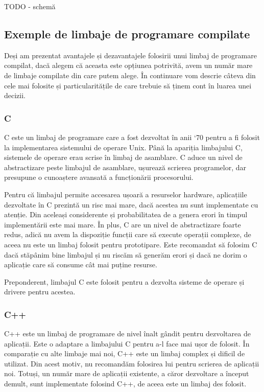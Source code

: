 TODO - schemă

\subsection{Exemple de limbaje de programare compilate}
\label{sec:appdev-langs-comp-ex}

Deși am prezentat avantajele și dezavantajele folosirii unui limbaj de
programare compilat, dacă alegem că aceasta este opțiunea potrivită, avem un
număr mare de limbaje compilate din care putem alege. În continuare vom descrie
câteva din cele mai folosite și particularitățile de care trebuie să ținem cont
în luarea unei decizii.

\subsubsection{C}
\label{sec:appdev-langs-comp-ex-c}

C este un limbaj de programare care a fost dezvoltat în anii ‘70 pentru a fi
folosit la implementarea sistemului de operare Unix. Până la apariția limbajului
C, sistemele de operare erau scrise în limbaj de asamblare. C aduce un nivel de
abstractizare peste limbajul de asamblare, ușurează scrierea programelor, dar
presupune o cunoaștere avansată a funcționării procesorului.

Pentru că limbajul permite accesarea ușoară a resurselor hardware, aplicațiile
dezvoltate în C prezintă un risc mai mare, dacă acestea nu sunt implementate cu
atenție. Din aceleași considerente și probabilitatea de a genera erori în timpul
implementării este mai mare. În plus, C are un nivel de abstractizare foarte
redus, adică nu avem la dispoziție funcții care să execute operații complexe, de
aceea nu este un limbaj folosit pentru prototipare. Este recomandat să folosim C
dacă stăpânim bine limbajul și nu riscăm să generăm erori și dacă ne dorim o
aplicație care să consume cât mai puține resurse.

Preponderent, limbajul C este folosit pentru a dezvolta sisteme de operare și
drivere pentru acestea.

\subsubsection{C++}
\label{sec:appdev-langs-comp-ex-cpp}

C++ este un limbaj de programare de nivel înalt gândit pentru dezvoltarea de
aplicații. Este o adaptare a limbajului C pentru a-l face mai ușor de folosit.
În comparație cu alte limbaje mai noi, C++ este un limbaj complex și dificil de
utilizat. Din acest motiv, nu recomandăm folosirea lui pentru scrierea de
aplicații noi. Totuși, un număr mare de aplicații existente, a căror dezvoltare
a început demult, sunt implementate folosind C++, de aceea este un limbaj des
folosit.

